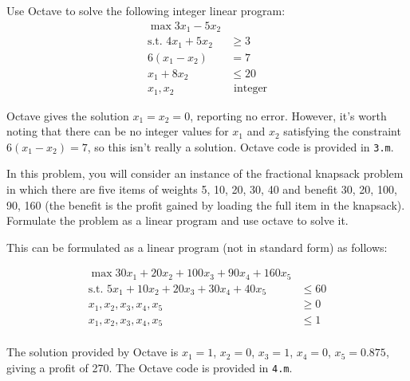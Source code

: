 \documentclass[fleqn]{homework}
\begin{document}
  \begin{problem}{3}
    \begin{question}
      Use Octave to solve the following integer linear program:
      \begin{align*}
        \max 3x_1 - 5x_2 & \\
        \text{s.t.  } 4x_1 + 5x_2 &\ge 3 \\
        6(x_1 - x_2) &= 7 \\
        x_1 + 8x_2 &\le 20 \\
        x_1, x_2 &\text{ integer}
      \end{align*}
    \end{question}

    Octave gives the solution $x_1 = x_2 = 0$, reporting no error.  However,
    it's worth noting that there can be no integer values for $x_1$ and $x_2$
    satisfying the constraint $6(x_1 - x_2) = 7$, so this isn't really a
    solution.  Octave code is provided in \texttt{3.m}.
  \end{problem}

  \begin{problem}{4}
    \begin{question}
      In this problem, you will consider an instance of the fractional knapsack
      problem in which there are five items of weights 5, 10, 20, 30, 40 and
      benefit 30, 20, 100, 90, 160 (the benefit is the profit gained by loading
      the full item in the knapsack).  Formulate the problem as a linear program
      and use octave to solve it.
    \end{question}

    This can be formulated as a linear program (not in standard form) as follows:
    
    \begin{align*}
      \max 30x_1 + 20x_2 + 100x_3 + 90x_4 + 160 x_5 &\\
      \text{s.t. } 5x_1 + 10x_2 + 20 x_3 + 30x_4 + 40x_5 &\leq 60 \\
      x_1, x_2, x_3, x_4, x_5 &\geq 0 \\
      x_1, x_2, x_3, x_4, x_5 &\leq 1 \\
    \end{align*}

    The solution provided by Octave is $x_1 = 1$, $x_2 = 0$, $x_3 = 1$,
    $x_4 = 0$, $x_5 = 0.875$, giving a profit of 270.  The Octave code is
    provided in \texttt{4.m}.
  \end{problem}
\end{document}
